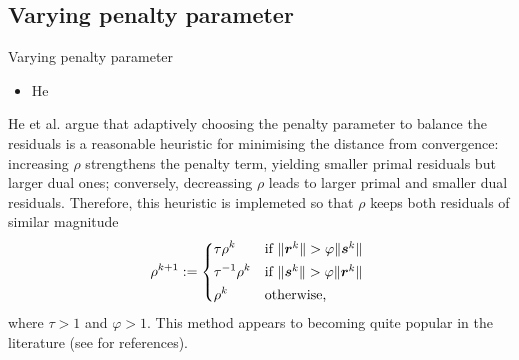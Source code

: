 \documentclass[8pt,red]{beamer}
\theoremstyle{plain}
\theoremstyle{definition}
\theoremstyle{remark}
\newcommand{\bi}[1]{\ensuremath{\boldsymbol{#1}}}
\begin{document}
\subsection{Varying penalty parameter}

\begin{frame}{Varying penalty parameter}
\begin{itemize}
\item He
\end{itemize}
He et al. \citep{He2000} argue that adaptively choosing the penalty parameter to balance the residuals is a reasonable heuristic for minimising the distance from convergence: increasing $\rho$ strengthens the penalty term, yielding smaller primal residuals but larger dual ones; conversely, decreassing $\rho$ leads to larger primal and smaller dual residuals. Therefore, this heuristic is implemeted so that $\rho$ keeps both residuals of similar magnitude
\begin{align}
  \rho^{k+1} := 
  \begin{dcases*}
	\tau \rho^{k}
    & if $ \| \bi{r}^{k} \| > \varphi \| \bi{s}^{k} \|$ \\
    \tau^{-1} \rho^{k}
    & if $ \| \bi{s}^{k} \| > \varphi \| \bi{r}^{k} \|$ \\
    \rho^{k}
    & otherwise, \\
  \end{dcases*}  
\end{align}
where $\tau > 1$ and $\varphi > 1$. This method appears to becoming quite popular in the literature (see \citep{wohlberg2017admm} for references).
\end{frame}
\end{document}
